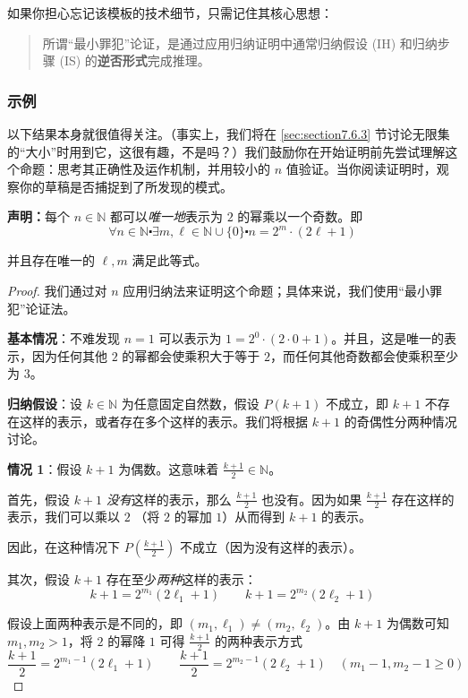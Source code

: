 如果你担心忘记该模板的技术细节，只需记住其核心思想：
\begin{quotation}
    所谓``最小罪犯''论证，是通过应用归纳证明中通常归纳假设 (IH) 和归纳步骤 (IS) 的\textbf{逆否形式}完成推理。
\end{quotation}

\subsubsection*{示例}

以下结果本身就很值得关注。（事实上，我们将在 \ref{sec:section7.6.3} 节讨论无限集的``大小''时用到它，这很有趣，不是吗？）我们鼓励你在开始证明前先尝试理解这个命题：思考其正确性及运作机制，并用较小的 $n$ 值验证。当你阅读证明时，观察你的草稿是否捕捉到了所发现的模式。

\begin{example}[将自然数唯一地表示为乘积]
    
    \textbf{声明：}每个 $n \in \mathbb{N}$ 都可以\emph{唯一地}表示为 $2$ 的幂乘以一个奇数。即
    \[\forall n \in \mathbb{N} \centerdot \exists m, \ell \in \mathbb{N} \cup \{0\} \centerdot n = 2^m \cdot (2\ell + 1)\]

    并且存在唯一的 $\ell, m$ 满足此等式。

    \begin{proof}
        我们通过对 $n$ 应用归纳法来证明这个命题；具体来说，我们使用``最小罪犯''论证法。

        \textbf{基本情况}：不难发现 $n = 1$ 可以表示为 $1 = 2^0 \cdot (2 \cdot 0 + 1)$。并且，这是唯一的表示，因为任何其他 $2$ 的幂都会使乘积大于等于 $2$，而任何其他奇数都会使乘积至少为 $3$。

        \textbf{归纳假设}：设 $k \in \mathbb{N}$ 为任意固定自然数，假设 $P(k+1)$ 不成立，即 $k+1$ 不存在这样的表示，或者存在多个这样的表示。我们将根据 $k+1$ 的奇偶性分两种情况讨论。

        \textbf{情况 1}：假设 $k+1$ 为偶数。这意味着 $\frac{k+1}{2} \in \mathbb{N}$。

        首先，假设 $k+1$ \emph{没有}这样的表示，那么 $\frac{k+1}{2}$ 也没有。因为如果 $\frac{k+1}{2}$ 存在这样的表示，我们可以乘以 $2$ （将 $2$ 的幂加 $1$）从而得到 $k+1$ 的表示。

        因此，在这种情况下 $P(\frac{k+1}{2})$ 不成立（因为没有这样的表示）。

        其次，假设 $k+1$ 存在至少\emph{两种}这样的表示：
        \[k + 1 = 2^{m_1}(2\ell_1 + 1) \qquad k + 1 = 2^{m_2}(2\ell_2 + 1)\]

        假设上面两种表示是不同的，即 $(m_1, \ell_1) \ne (m_2, \ell_2)$。由 $k+1$ 为偶数可知 $m_1, m_2 > 1$，将 $2$ 的幂降 $1$ 可得 $\frac{k+1}{2}$ 的两种表示方式
        \[\frac{k+1}{2}=2^{m_1-1}(2\ell_1+1) \qquad \frac{k+1}{2}=2^{m_2-1}(2\ell_2+1) \quad (m_1-1, m_2-1 \ge 0)\]


\end{proof}
\end{example}
